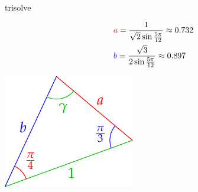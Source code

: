 \begin{examples}{}{trisolve}
\begin{enumerate}
\begin{minipage}[t]{0.75\linewidth}
\begin{align*}
		  	&\textcolor{red}{a}
		  		=\frac 1{\sqrt 2\sin\frac{5\pi}{12}}\approx 0.732\\
		  	&\textcolor{blue}{b}
		  		=\frac{\sqrt 3}{2\sin\frac{5\pi}{12}}\approx 0.897
		  \end{align*}
		\end{minipage}\hfill\begin{minipage}[t]{0.24\linewidth}\vspace{0pt}
			\flushright\includegraphics[scale=0.95]{angles-asasolve}
		\end{minipage}
	\end{enumerate}
\end{examples}


\goodbreak



